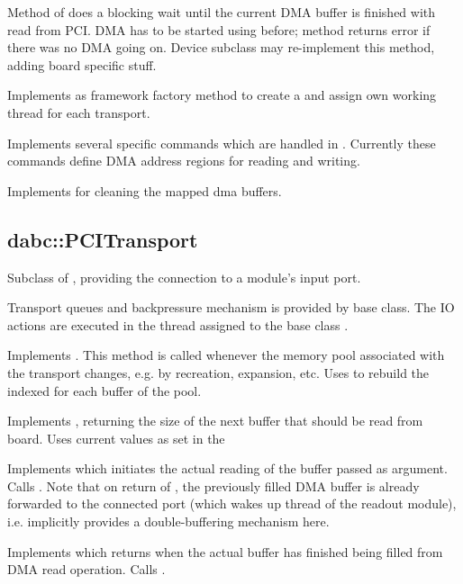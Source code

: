 \item Method  of  does a blocking wait until the current DMA buffer is finished with read from PCI. DMA has to be started using  before; method returns error if there was no DMA going on. Device subclass may re-implement this method, adding board specific stuff.
\item Implements  as framework factory method to create a  and assign own working thread for each transport.
\item Implements several specific commands which are handled in . Currently these commands define DMA address regions for reading and writing.
\item Implements  for cleaning the mapped dma buffers.
\ecir
\subsection{dabc::PCITransport}
    Subclass of , providing the connection to a module's input port.
\bcir
\item Transport queues and backpressure mechanism is provided by base class. The IO actions are executed in the thread assigned to the base class .
\item Implements . This method is called whenever the memory pool associated with the transport changes, e.g. by recreation, expansion, etc. Uses  to rebuild the indexed  for each buffer of the pool.
\item Implements , returning the size of the next buffer that should be read from board. Uses current values as set in the 
\item Implements  which initiates the actual reading of the buffer passed as argument. Calls . Note that on return of , the previously filled DMA buffer is already forwarded to the connected port (which wakes up thread of the readout module), i.e.  implicitly provides a double-buffering mechanism here.
\item Implements  which returns when the actual buffer has finished being filled from DMA read operation. Calls .
\ecir
